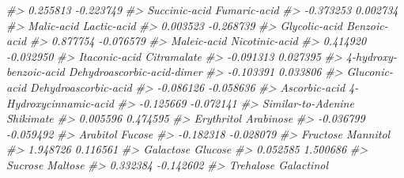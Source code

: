 \documentclass[
]{article}
\newenvironment{Shaded}{\begin{snugshade}}{\end{snugshade}}
\newcommand{\CommentTok}[1]{\textcolor[rgb]{0.56,0.35,0.01}{\textit{#1}}}
\begin{document}
\begin{Shaded}
\begin{Highlighting}[]
\CommentTok{\#\textgreater{}                   0.255813                  {-}0.223749 }
\CommentTok{\#\textgreater{}              Succinic{-}acid               Fumaric{-}acid }
\CommentTok{\#\textgreater{}                  {-}0.373253                   0.002734 }
\CommentTok{\#\textgreater{}                 Malic{-}acid                Lactic{-}acid }
\CommentTok{\#\textgreater{}                   0.003523                  {-}0.268739 }
\CommentTok{\#\textgreater{}              Glycolic{-}acid               Benzoic{-}acid }
\CommentTok{\#\textgreater{}                   0.877754                  {-}0.076579 }
\CommentTok{\#\textgreater{}                Maleic{-}acid             Nicotinic{-}acid }
\CommentTok{\#\textgreater{}                   0.414920                  {-}0.032950 }
\CommentTok{\#\textgreater{}              Itaconic{-}acid                Citramalate }
\CommentTok{\#\textgreater{}                  {-}0.091313                   0.027395 }
\CommentTok{\#\textgreater{}     4{-}hydroxy{-}benzoic{-}acid Dehydroascorbic{-}acid{-}dimer }
\CommentTok{\#\textgreater{}                  {-}0.103391                   0.033806 }
\CommentTok{\#\textgreater{}              Gluconic{-}acid       Dehydroascorbic{-}acid }
\CommentTok{\#\textgreater{}                  {-}0.086126                  {-}0.058636 }
\CommentTok{\#\textgreater{}              Ascorbic{-}acid     4{-}Hydroxycinnamic{-}acid }
\CommentTok{\#\textgreater{}                  {-}0.125669                  {-}0.072141 }
\CommentTok{\#\textgreater{}         Similar{-}to{-}Adenine                  Shikimate }
\CommentTok{\#\textgreater{}                   0.005596                   0.474595 }
\CommentTok{\#\textgreater{}                 Erythritol                  Arabinose }
\CommentTok{\#\textgreater{}                  {-}0.036799                  {-}0.059492 }
\CommentTok{\#\textgreater{}                   Arabitol                     Fucose }
\CommentTok{\#\textgreater{}                  {-}0.182318                  {-}0.028079 }
\CommentTok{\#\textgreater{}                   Fructose                   Mannitol }
\CommentTok{\#\textgreater{}                   1.948726                   0.116561 }
\CommentTok{\#\textgreater{}                  Galactose                    Glucose }
\CommentTok{\#\textgreater{}                   0.052585                   1.500686 }
\CommentTok{\#\textgreater{}                    Sucrose                    Maltose }
\CommentTok{\#\textgreater{}                   0.332384                  {-}0.142602 }
\CommentTok{\#\textgreater{}                  Trehalose                 Galactinol }

\end{Highlighting}
\end{Shaded}
\end{document}

